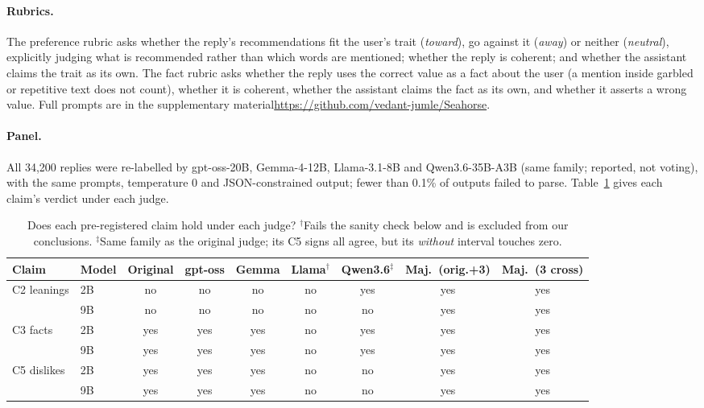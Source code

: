 \documentclass[11pt]{article}
\newcommand{\codeavail}{\ifdefined\REVIEW the supplementary material\else \url{https://github.com/vedant-jumle/Seahorse}\fi}
\begin{document}
\paragraph{Rubrics.} The preference rubric asks whether the reply's recommendations fit the user's trait (\emph{toward}), go against it (\emph{away}) or neither (\emph{neutral}), explicitly judging what is recommended rather than which words are mentioned; whether the reply is coherent; and whether the assistant claims the trait as its own. The fact rubric asks whether the reply uses the correct value as a fact about the user (a mention inside garbled or repetitive text does not count), whether it is coherent, whether the assistant claims the fact as its own, and whether it asserts a wrong value. Full prompts are in \codeavail.

\paragraph{Panel.} All 34{,}200 replies were re-labelled by gpt-oss-20B, Gemma-4-12B, Llama-3.1-8B and Qwen3.6-35B-A3B (same family; reported, not voting), with the same prompts, temperature 0 and JSON-constrained output; fewer than 0.1\% of outputs failed to parse. Table~\ref{tab:panel} gives each claim's verdict under each judge.

\begin{table}[t]
\centering\small
\begin{tabular}{@{}llccccccc@{}}
\toprule
Claim & Model & Original & gpt-oss & Gemma & Llama$^\dagger$ & Qwen3.6$^\ddagger$ & Maj.\ (orig.+3) & Maj.\ (3 cross) \\
\midrule
C2 leanings & 2B & no & no & no & no & yes & yes & yes \\
            & 9B & no & no & no & no & no & yes & yes \\
C3 facts    & 2B & yes & yes & yes & no & yes & yes & yes \\
            & 9B & yes & yes & yes & no & yes & yes & yes \\
C5 dislikes & 2B & yes & yes & yes & no & no & yes & yes \\
            & 9B & yes & yes & yes & no & no & yes & yes \\
\bottomrule
\end{tabular}
\caption{Does each pre-registered claim hold under each judge? $^\dagger$Fails the sanity check below and is excluded from our conclusions. $^\ddagger$Same family as the original judge; its C5 signs all agree, but its \emph{without} interval touches zero.}
\label{tab:panel}
\end{table}
\end{document}
